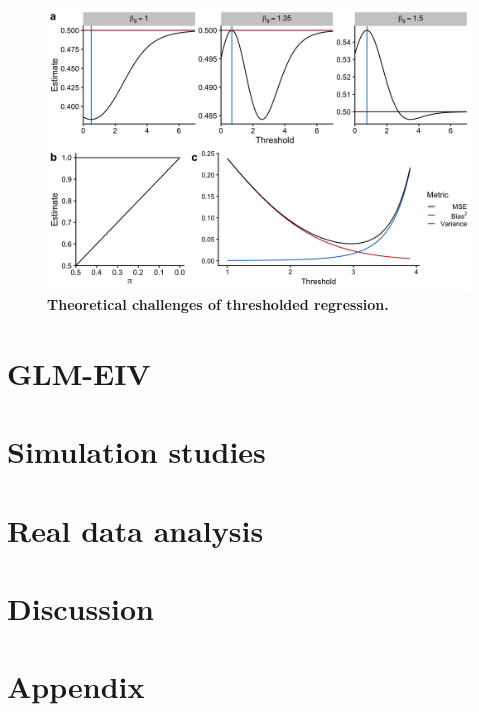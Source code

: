 \documentclass[12pt]{article}
\begin{document}
\begin{figure}[h!]
	\centering
	\includegraphics[width=1\linewidth]{../../figures/thresholding_theoretical/plot}
	\caption{\textbf{Theoretical challenges of thresholded regression.}}
	\label{thresholding_theoretical}
\end{figure}


\section{GLM-EIV}

\section{Simulation studies}

\section{Real data analysis}

\section{Discussion}

\section{Appendix}
\end{document}
